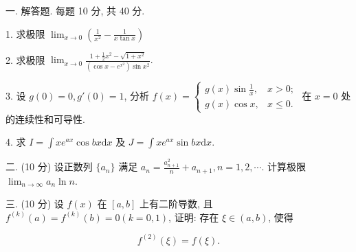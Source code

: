 \documentclass{examcollection}
\renewcommand{\displayformula}[1]{\[#1\]}
\begin{document}
{\begin{minipage}{\textwidth}
\smallskip
一. 解答题. 每题 10 分, 共 40 分.\par
1. 求极限 $\lim_{x\to 0}\left(\frac{1}{x^2} -\frac{1}{x\tan x}\right)$\par
2. 求极限 $\lim_{x\to 0}\frac{1 + \frac{1}{2}x^2 - \sqrt{1 + x^2}}{(\cos x - e^{x^2})\sin x^2}.$\par
3. 设 $g(0) = 0, g'(0) = 1$, 分析 $f(x) = \begin{cases} g(x) \sin \frac{1}{x}, & x > 0; \\ g(x) \cos x, & x \leq 0. \end{cases}$ 在 $x = 0$ 处的连续性和可导性.\par
4. 求 $I = \int xe^{ax}\cos bx\mathrm{d}x$ 及 $J = \int xe^{ax}\sin bx\mathrm{d}x.$\par
二. (10 分) 设正数列 $\{a_{n}\}$ 满足 $a_{n} = \frac{a_{n+1}^{2}}{n} + a_{n+1}, n = 1,2,\cdots$. 计算极限 $\lim_{n\to \infty}a_n\ln n$.\par
三. (10 分) 设 $f(x)$ 在 $[a, b]$ 上有二阶导数, 且 $f^{(k)}(a) = f^{(k)}(b) = 0 (k = 0, 1)$, 证明: 存在 $\xi \in (a, b)$, 使得\par
\displayformula{f ^ {(2)} (\xi) = f (\xi).}\par
\end{minipage}}
\ifdim\dimexpr\ht\proofbox+\dp\proofbox\relax>\textheight
\noindent\resizebox{!}{\textheight}{\usebox{\proofbox}}\else\noindent\usebox{\proofbox}\fi\clearpage
\end{document}
